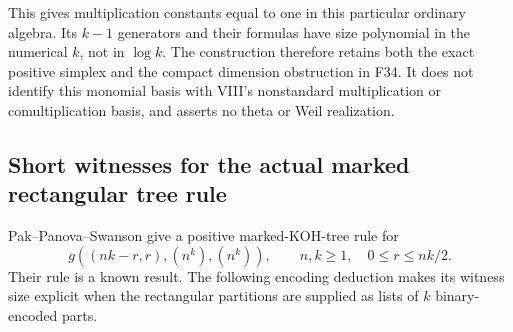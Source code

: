 \documentclass[11pt,a4paper]{article}
\newcommand{\fid}[1]{\textsf{#1}}\newcommand{\gate}[1]{\textsf{#1}}
\theoremstyle{named}\newtheorem{finding}{Finding}[section]
\theoremstyle{definition}\newtheorem{definition}[finding]{Definition}
\theoremstyle{remark}\newtheorem{remark}[finding]{Remark}
\begin{document}
This gives multiplication constants equal to one in this particular
ordinary algebra. Its $k-1$ generators and their formulas have size
polynomial in the numerical $k$, not in $\log k$. The construction
therefore retains both the exact positive simplex and the compact
dimension obstruction in \fid{F34}. It does not identify this
monomial basis with VIII's nonstandard multiplication or
comultiplication basis, and asserts no theta or Weil realization.


\subsection{Short witnesses for the actual marked rectangular tree rule}
Pak--Panova--Swanson \cite[Theorem~4.5, p.~10]{PPS} give a positive
marked-KOH-tree rule for
\[
 g((nk-r,r),(n^k),(n^k)),\qquad
 n,k\ge1,\quad 0\le r\le nk/2.
\]
Their rule is a known result. The following encoding deduction makes
its witness size explicit when the rectangular partitions are supplied
as lists of $k$ binary-encoded parts.
\end{document}
